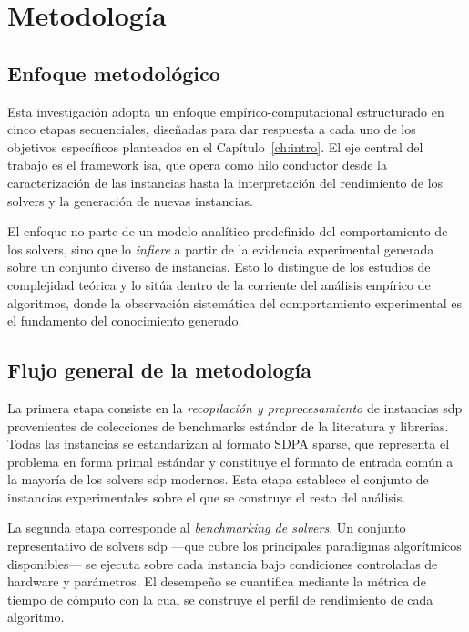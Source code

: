 \chapter{Metodología}
\label{ch:metodo}


\section{Enfoque metodológico}%
\label{sec:enfoque}

Esta investigación adopta un enfoque empírico-computacional estructurado en cinco etapas
secuenciales, diseñadas para dar respuesta a cada uno de los objetivos específicos planteados
en el Capítulo~\ref{ch:intro}.
El eje central del trabajo es el framework \acrshort{isa}, que opera como hilo conductor
desde la caracterización de las instancias hasta la interpretación del rendimiento de los
solvers y la generación de nuevas instancias.

El enfoque no parte de un modelo analítico predefinido del comportamiento de los solvers,
sino que lo \textit{infiere} a partir de la evidencia experimental generada sobre un conjunto
diverso de instancias.
Esto lo distingue de los estudios de complejidad teórica y lo sitúa dentro de la corriente
del análisis empírico de algoritmos, donde la observación sistemática del comportamiento
experimental es el fundamento del conocimiento generado.

\section{Flujo general de la metodología}%
\label{sec:flujo}

La primera etapa consiste en la \textit{recopilación y preprocesamiento} de instancias
\acrshort{sdp} provenientes de colecciones de benchmarks estándar de la literatura y librerias.
Todas las instancias se estandarizan al formato SDPA sparse, que representa el problema
en forma primal estándar y constituye el formato de entrada común a la mayoría de los
solvers \acrshort{sdp} modernos.
Esta etapa establece el conjunto de instancias experimentales sobre el que se construye el resto del análisis.

La segunda etapa corresponde al \textit{benchmarking de solvers}.
Un conjunto representativo de solvers \acrshort{sdp}
—que cubre los principales paradigmas algorítmicos disponibles—
se ejecuta sobre cada instancia bajo condiciones controladas de hardware y parámetros.
El desempeño se cuantifica mediante la métrica de tiempo de cómputo con la cual se construye el perfil de
rendimiento de cada algoritmo.

